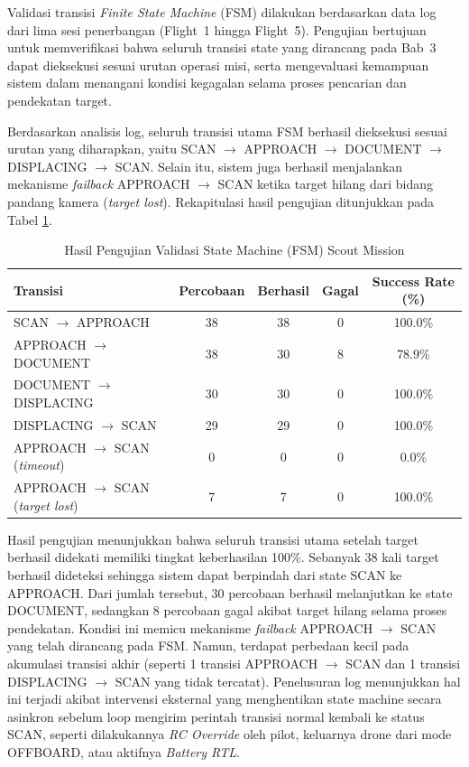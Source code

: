 Validasi transisi \textit{Finite State Machine} (FSM) dilakukan berdasarkan data log dari lima sesi penerbangan (Flight~1 hingga Flight~5). Pengujian bertujuan untuk memverifikasi bahwa seluruh transisi state yang dirancang pada Bab~3 dapat dieksekusi sesuai urutan operasi misi, serta mengevaluasi kemampuan sistem dalam menangani kondisi kegagalan selama proses pencarian dan pendekatan target.

Berdasarkan analisis log, seluruh transisi utama FSM berhasil dieksekusi sesuai urutan yang diharapkan, yaitu SCAN $\rightarrow$ APPROACH $\rightarrow$ DOCUMENT $\rightarrow$ DISPLACING $\rightarrow$ SCAN. Selain itu, sistem juga berhasil menjalankan mekanisme \textit{failback} APPROACH $\rightarrow$ SCAN ketika target hilang dari bidang pandang kamera (\textit{target lost}). Rekapitulasi hasil pengujian ditunjukkan pada Tabel \ref{tab:fsm_transitions}.

\begin{table}[H]
	\centering
	\caption{Hasil Pengujian Validasi State Machine (FSM) Scout Mission}
	\label{tab:fsm_transitions}
	\renewcommand{\arraystretch}{1.2}
	\begin{tabular}{|l|c|c|c|c|}
		\hline
		\textbf{Transisi} & \textbf{Percobaan} & \textbf{Berhasil} & \textbf{Gagal} & \textbf{Success Rate (\%)} \\ \hline
		SCAN $\to$ APPROACH & 38 & 38 & 0 & 100.0\% \\ \hline
		APPROACH $\to$ DOCUMENT & 38 & 30 & 8 & 78.9\% \\ \hline
		DOCUMENT $\to$ DISPLACING & 30 & 30 & 0 & 100.0\% \\ \hline
		DISPLACING $\to$ SCAN & 29 & 29 & 0 & 100.0\% \\ \hline
		APPROACH $\to$ SCAN (\textit{timeout}) & 0 & 0 & 0 & 0.0\% \\ \hline
		APPROACH $\to$ SCAN (\textit{target lost}) & 7 & 7 & 0 & 100.0\% \\ \hline
	\end{tabular}
\end{table}

Hasil pengujian menunjukkan bahwa seluruh transisi utama setelah target berhasil didekati memiliki tingkat keberhasilan 100\%. Sebanyak 38 kali target berhasil dideteksi sehingga sistem dapat berpindah dari state SCAN ke APPROACH. Dari jumlah tersebut, 30 percobaan berhasil melanjutkan ke state DOCUMENT, sedangkan 8 percobaan gagal akibat target hilang selama proses pendekatan. Kondisi ini memicu mekanisme \textit{failback} APPROACH $\rightarrow$ SCAN yang telah dirancang pada FSM. Namun, terdapat perbedaan kecil pada akumulasi transisi akhir (seperti 1 transisi APPROACH $\rightarrow$ SCAN dan 1 transisi DISPLACING $\rightarrow$ SCAN yang tidak tercatat). Penelusuran log menunjukkan hal ini terjadi akibat intervensi eksternal yang menghentikan state machine secara asinkron sebelum loop mengirim perintah transisi normal kembali ke status SCAN, seperti dilakukannya \textit{RC Override} oleh pilot, keluarnya drone dari mode OFFBOARD, atau aktifnya \textit{Battery RTL}.

